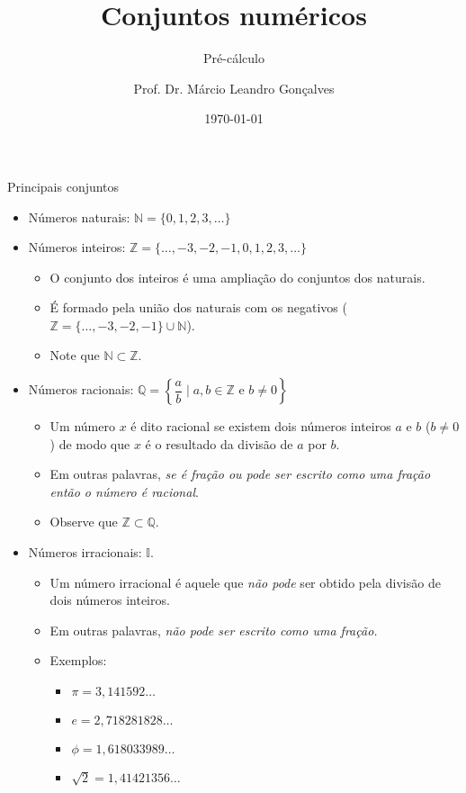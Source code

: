 \documentclass[14pt, aspectratio=169]{beamer}
\title{Conjuntos numéricos}
\subtitle{Pré-cálculo}
\author{Prof. Dr. Márcio Leandro Gonçalves}
\date{\today}
\institute{PUC Minas - Poços de Caldas}
\newcommand{\I}{\mathbb{I}}
\newcommand{\Q}{\mathbb{Q}}
\newcommand{\Z}{\mathbb{Z}}
\newcommand{\N}{\mathbb{N}}
\begin{document}
\begin{frame}
\maketitle 
\end{frame}

\begin{frame}[allowframebreaks]{Principais conjuntos}
\begin{itemize}
    \item Números naturais: $\N = \{ 0,1,2,3, \ldots \}$
    \item Números inteiros: $\Z = \{\ldots, -3, -2, -1, 0, 1, 2, 3, \ldots \}$ 
    \begin{itemize}
        \item O conjunto dos inteiros é uma ampliação do conjuntos dos naturais.
        \item É formado pela união dos naturais com os negativos ($\mathbb{Z} = \{ \ldots, -3, -2, -1\} \cup \N$).
        \item Note que $\N \subset \Z$.
    \end{itemize}

    \vspace{5.0cm}
    
    \item Números racionais: $\Q = \left\{ \dfrac{a}{b} \mid a,b \in \Z \text{ e } b \neq 0 \right\}$
    \begin{itemize}
        \item Um número $x$ é dito racional se existem dois números inteiros $a$ e $b$ ($b \neq 0$) de modo que $x$ é o resultado da divisão de $a$ por $b$.
        \item Em outras palavras, \emph{se é fração ou pode ser escrito como uma fração então o número é racional}.
        \item Observe que $\Z \subset \Q$.
    \end{itemize}

    \vspace{5.0cm}

    \item Números irracionais: $\I$.
    \begin{itemize}
        \item Um número irracional é aquele que \emph{não pode} ser obtido pela divisão de dois números inteiros.
        \item Em outras palavras, \emph{não pode ser escrito como uma fração.}
        \item Exemplos:
            \begin{itemize}
                \item $\pi = 3,141592\ldots$
                \item $e = 2,718281828\ldots$
                \item $\phi = 1,618033989\ldots$
                \item $\sqrt{2} = 1,41421356\ldots$
            \end{itemize}
    \end{itemize}


\end{itemize}
\end{frame}
\end{document}

